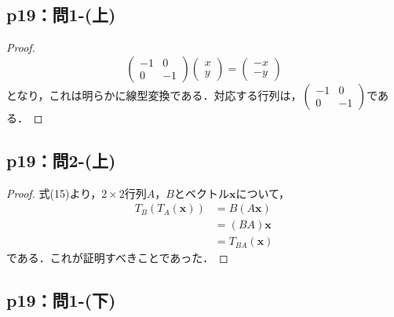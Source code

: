 \documentclass[uplatex,dvipdfmx,a4paper,10pt,fleqn]{jsarticle}
\begin{document}
\subsection*{p19：問1-(上)}
%
\begin{tleftbar}
	\begin{proof}
		\[
			\begin{pmatrix}
				-1 & 0\\
				0 & -1
			\end{pmatrix}
				\begin{pmatrix}
					x \\
					y 
				\end{pmatrix}
			=
				\begin{pmatrix}
					-x \\
					-y 
				\end{pmatrix}
			\]
			となり，これは明らかに線型変換である．対応する行列は，$
			\begin{pmatrix}
				-1 & 0 \\
				0 & -1
			\end{pmatrix}
			$である．
		\end{proof}
	\end{tleftbar}

    \subsection*{p19：問2-(上)}
	\begin{tleftbar}
		\begin{proof}
			式(15)より，$2 \times 2$行列$A$，$B$とベクトル$\bm{x}$について，
			\begin{align*}
				T_B (T_A (\bm{x})) &= B(A\bm{x}) \\
				& = (BA) \bm{x} \\
				& = T_{BA} (\bm{x})
			\end{align*}
			である．これが証明すべきことであった．
		\end{proof}
    \end{tleftbar}


    \subsection*{p19：問1-(下)}
\end{document}
